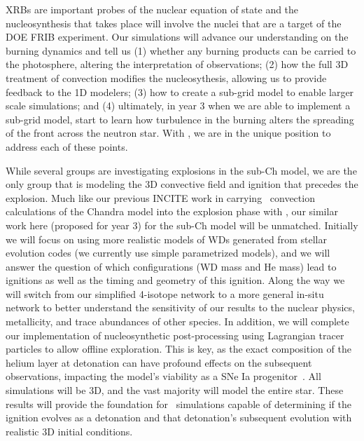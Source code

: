 \documentclass[11pt,letterpaper,english]{article}
\begin{document}
XRBs are important probes of the nuclear equation of 
state and the nucleosynthesis that
takes place will involve the nuclei that are a target of the DOE FRIB
experiment.  Our simulations will advance our understanding on the
burning dynamics and tell us (1) whether any burning products can be
carried to the photosphere, altering the interpretation of
observations; (2) how the full 3D treatment of convection modifies the
nucleosythesis, allowing us to provide feedback to the 1D modelers;
(3) how to create a sub-grid model to enable larger scale simulations;
and (4) ultimately, in year 3 when we are able to implement a sub-grid
model, start to learn how turbulence in the burning alters the
spreading of the front across the neutron star.  With \maestro, we are
in the unique position to address each of these points.

While several groups are investigating explosions in the sub-Ch model,
we are the only group that is modeling the 3D convective field and
ignition that precedes the explosion.  Much like our previous INCITE
work in carrying \maestro\ convection calculations of the Chandra
model into the explosion phase with \castro, our similar work here
(proposed for year 3) for the sub-Ch model will be unmatched.
Initially we will focus on using more realistic models of WDs
generated from stellar evolution codes (we currently use simple
parametrized models), and we will answer the question of which
configurations (WD mass and He mass) lead to ignitions as well as the
timing and geometry of this ignition.  Along the way we will switch
from our simplified 4-isotope network to a more general in-situ
network to better understand the sensitivity of our results to the
nuclear physics, metallicity, and trace abundances of other species.
In addition, we will complete our implementation of nucleosynthetic
post-processing using Lagrangian tracer particles to allow offline
exploration.  This is key, as the exact composition of the helium
layer at detonation can have profound effects on the subsequent
observations, impacting the model's viability as a SNe Ia
progenitor~\cite{kromer:2010}.  All simulations will be 3D, and the
vast majority will model the entire star.  These results will provide
the foundation for \castro\ simulations capable of determining if the
ignition evolves as a detonation and that detonation's subsequent
evolution with realistic 3D initial conditions.
 
\end{document}
